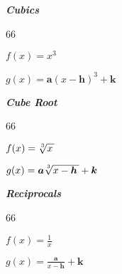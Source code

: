 \vfil
{
    \begin{minipage}{0.2\textwidth}
        \begin{center}
            {\bfseries\itshape Cubics}\\
            \begin{myTikzpictureGrid}{0.25} {6}{6}
            \end{myTikzpictureGrid}
        \end{center}\vspace{-1\onelineskip}
        {$f(x) = x^3$}

        {$g(x) = \bm{a} (x-\bm{h})^3 + \bm{k}$}
    \end{minipage}
}
\hfill 
{
    \begin{minipage}{0.2\textwidth}
        \begin{center}
            {\bfseries\itshape Cube Root}\\
            \begin{myTikzpictureGrid}{0.25} {6}{6}
        \end{myTikzpictureGrid}
    \end{center}\vspace{-1\onelineskip}
    {$f(x) = \myRoot[3]{x}$}

        {$g(x) = \bm{a}\myRoot[3]{x-\bm{h}} + \bm{k}$}
    \end{minipage}
}
\hfill 
{
    \begin{minipage}{0.2\textwidth}
        \begin{center}
            {\bfseries\itshape Reciprocals}\\
            \begin{myTikzpictureGrid}{0.25} {6}{6}
            \end{myTikzpictureGrid}
        \end{center}\vspace{-1\onelineskip}
        {$f(x) = \frac{1}{x}$}

        {$g(x) = \frac{\bm{a}}{x-\bm{h}} + \bm{k}$}
    \end{minipage}
}
\vfil



